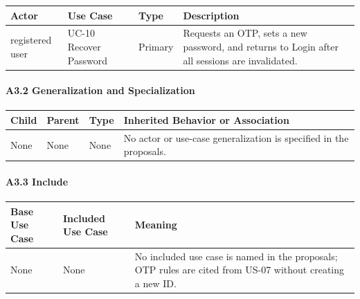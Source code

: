\documentclass[12pt]{article}
\renewcommand{\baselinestretch}{1.5}
\begin{document}
\begingroup
\small
\renewcommand{\baselinestretch}{1.0}\selectfont
\renewcommand{\arraystretch}{1.15}
\setlength{\tabcolsep}{6pt}
\begin{longtable}{|>{\raggedright\arraybackslash}p{}|>{\raggedright\arraybackslash}p{}|>{\raggedright\arraybackslash}p{}|>{\raggedright\arraybackslash}p{}|}
\hline
\textbf{Actor} & \textbf{Use Case} & \textbf{Type} & \textbf{Description} \\ \hline
\endhead
registered user & UC-10 Recover Password & Primary & Requests an OTP, sets a new password, and returns to Login after all sessions are invalidated. \\ \hline
\end{longtable}
\endgroup
\par\medskip

\hypertarget{sec:a3-2-generalization-and-specialization}{}
\paragraph*{A3.2 Generalization and Specialization}
\par\medskip

\begingroup
\small
\renewcommand{\baselinestretch}{1.0}\selectfont
\renewcommand{\arraystretch}{1.15}
\setlength{\tabcolsep}{6pt}
\begin{longtable}{|>{\raggedright\arraybackslash}p{}|>{\raggedright\arraybackslash}p{}|>{\raggedright\arraybackslash}p{}|>{\raggedright\arraybackslash}p{}|}
\hline
\textbf{Child} & \textbf{Parent} & \textbf{Type} & \textbf{Inherited Behavior or Association} \\ \hline
\endhead
None & None & None & No actor or use-case generalization is specified in the proposals. \\ \hline
\end{longtable}
\endgroup
\par\medskip

\hypertarget{sec:a3-3-include}{}
\paragraph*{A3.3 Include}
\par\medskip

\begingroup
\small
\renewcommand{\baselinestretch}{1.0}\selectfont
\renewcommand{\arraystretch}{1.15}
\setlength{\tabcolsep}{6pt}
\begin{longtable}{|>{\raggedright\arraybackslash}p{}|>{\raggedright\arraybackslash}p{}|>{\raggedright\arraybackslash}p{}|}
\hline
\textbf{Base Use Case} & \textbf{Included Use Case} & \textbf{Meaning} \\ \hline
\endhead
None & None & No included use case is named in the proposals; OTP rules are cited from US-07 without creating a new ID. \\ \hline
\end{longtable}
\endgroup
\par\medskip
\end{document}
